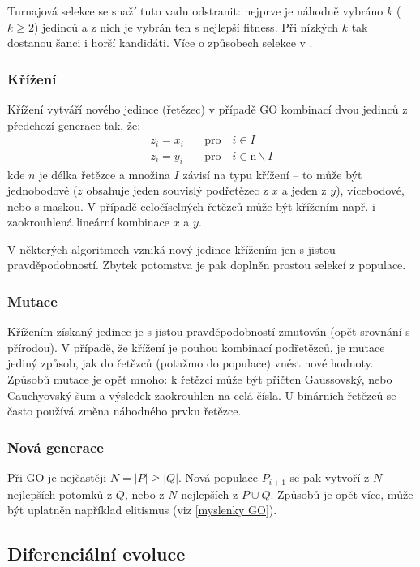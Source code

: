 Turnajová selekce se snaží tuto vadu odstranit: nejprve je náhodně vybráno $k$ ($k\geq 2$) jedinců a z nich je vybrán ten s nejlepší fitness. Při nízkých $k$ tak dostanou šanci i horší kandidáti. Více o způsobech selekce v \cite{GO ebook}.

\subsubsection{Křížení}

Křížení vytváří nového jedince (řetězec) v případě GO kombinací dvou jedinců z předchozí generace tak, že:
\[
\begin{split}
z_i = x_i &\quad\text{pro}\quad i \in I \\
z_i = y_i &\quad\text{pro}\quad i \in \text{\^{n}}\backslash I
\end{split}
\]
kde $n$ je délka řetězce a množina $I$ závisí na typu křížení -- to může být jednobodové ($z$ obsahuje jeden souvislý podřetězec z $x$ a jeden z $y$), vícebodové, nebo s maskou. V případě celočíselných řetězců může být křížením např. i zaokrouhlená lineární kombinace $x$ a $y$. 

V některých algoritmech vzniká nový jedinec křížením jen s jistou pravděpodobností. Zbytek potomstva je pak doplněn prostou selekcí z populace.

\subsubsection{Mutace}

Křížením získaný jedinec je s jistou pravděpodobností zmutován (opět srovnání s přírodou). V případě, že křížení je pouhou kombinací podřetězců, je mutace jediný způsob, jak do řetězců (potažmo do populace) vnést nové hodnoty. Způsobů mutace je opět mnoho: k řetězci může být přičten Gaussovský, nebo Cauchyovský šum a výsledek zaokrouhlen na celá čísla. U binárních řetězců se často používá změna náhodného prvku řetězce.

\subsubsection{Nová generace}

Při GO je nejčastěji $N = |P| \geq |Q|$. Nová populace $P_{i+1}$ se pak vytvoří z $N$ nejlepších potomků z $Q$, nebo z $N$ nejlepších z $P \cup Q$. Způsobů je opět více, může být uplatněn například elitismus (viz \ref{myslenky GO}).

\subsection{Diferenciální evoluce}


